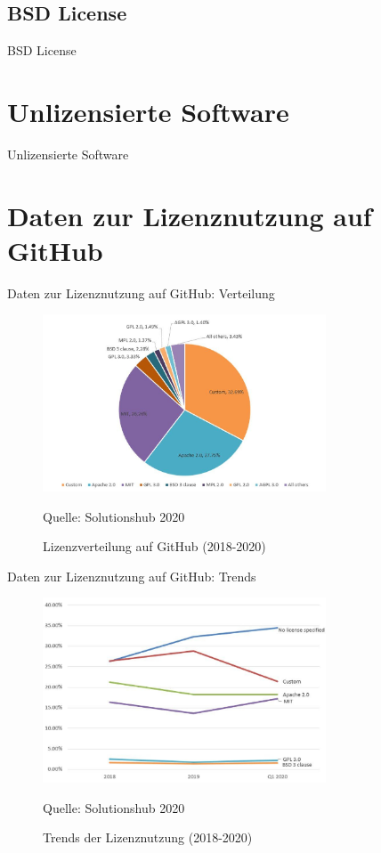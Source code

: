 \documentclass{beamer}
\begin{document}
\subsection{BSD License}
\begin{frame}{BSD License}
\end{frame}

\section{Unlizensierte Software}
\begin{frame}{Unlizensierte Software}
\end{frame}

\section{Daten zur Lizenznutzung auf GitHub}
\begin{frame}{Daten zur Lizenznutzung auf GitHub: Verteilung}
	\begin{figure}[ht]
		\includegraphics[width=0.75\textwidth]{lizenzverteilung}
		\centering
		\caption{Lizenzverteilung auf GitHub (2018-2020)}
		Quelle: Solutionshub 2020
	\end{figure}
\end{frame}

\begin{frame}{Daten zur Lizenznutzung auf GitHub: Trends}
	\begin{figure}[ht]
		\includegraphics[width=0.75\textwidth]{trend}
		\centering
		\caption{Trends der Lizenznutzung (2018-2020)}
		Quelle: Solutionshub 2020
	\end{figure}
\end{frame}
\end{document}
